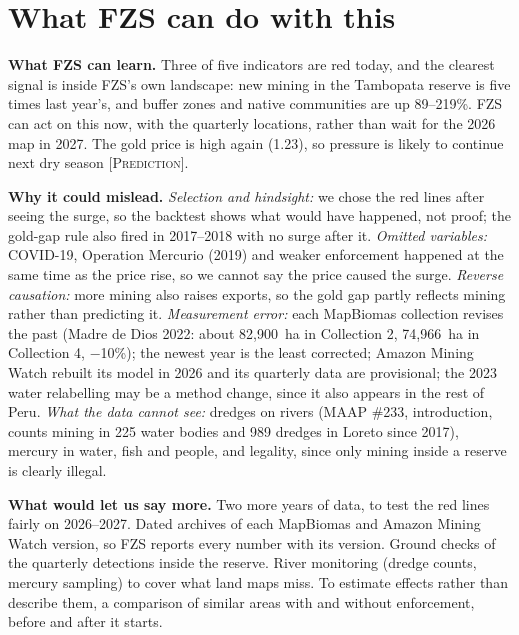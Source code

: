 \documentclass[10pt,a4paper]{article}
\newcommand{\lab}[1]{{\footnotesize\textsc{[#1]}}}
\begin{document}
\section{What FZS can do with this}

\textbf{What FZS can learn.} Three of five indicators are red today, and the clearest signal is inside FZS's own landscape: new mining in the Tambopata reserve is five times last year's, and buffer zones and native communities are up 89--219\%. FZS can act on this now, with the quarterly locations, rather than wait for the 2026 map in 2027. The gold price is high again (1.23), so pressure is likely to continue next dry season \lab{Prediction}.

\textbf{Why it could mislead.} \emph{Selection and hindsight:} we chose the red lines after seeing the surge, so the backtest shows what would have happened, not proof; the gold-gap rule also fired in 2017--2018 with no surge after it. \emph{Omitted variables:} COVID-19, Operation Mercurio (2019) and weaker enforcement happened at the same time as the price rise, so we cannot say the price caused the surge. \emph{Reverse causation:} more mining also raises exports, so the gold gap partly reflects mining rather than predicting it. \emph{Measurement error:} each MapBiomas collection revises the past (Madre de Dios 2022: about 82,900~ha in Collection 2, 74,966~ha in Collection 4, $-$10\%); the newest year is the least corrected; Amazon Mining Watch rebuilt its model in 2026 and its quarterly data are provisional; the 2023 water relabelling may be a method change, since it also appears in the rest of Peru. \emph{What the data cannot see:} dredges on rivers (MAAP \#233, introduction, counts mining in 225 water bodies and 989 dredges in Loreto since 2017), mercury in water, fish and people, and legality, since only mining inside a reserve is clearly illegal.

\textbf{What would let us say more.} Two more years of data, to test the red lines fairly on 2026--2027. Dated archives of each MapBiomas and Amazon Mining Watch version, so FZS reports every number with its version. Ground checks of the quarterly detections inside the reserve. River monitoring (dredge counts, mercury sampling) to cover what land maps miss. To estimate effects rather than describe them, a comparison of similar areas with and without enforcement, before and after it starts.

\newpage
\end{document}
